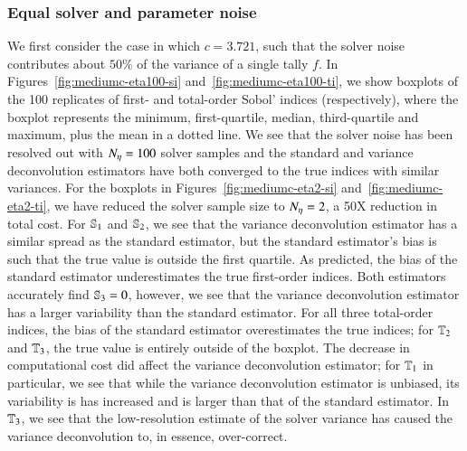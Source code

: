\subsubsection{Equal solver and parameter noise}
We first consider the case in which $c=3.721$, such that the solver noise contributes about $50\%$ of the variance of a single tally $f$.
In Figures~\ref{fig:mediumc-eta100-si} and~\ref{fig:mediumc-eta100-ti}, we show boxplots of the 100 replicates of first- and total-order Sobol’ indices (respectively), where the boxplot represents the minimum, first-quartile, median, third-quartile and maximum, plus the mean in a dotted line.
We see that the solver noise has been resolved out with $\Neta=100$ solver samples and the standard and variance deconvolution estimators have both converged to the true indices with similar variances. 
For the boxplots in Figures~\ref{fig:mediumc-eta2-si} and~\ref{fig:mediumc-eta2-ti}, we have reduced the solver sample size to $\Neta=2$, a 50X reduction in total cost. 
For $\S{1}$ and $\S{2}$, we see that the variance deconvolution estimator has a similar spread as the standard estimator, but the standard estimator's bias is such that the true value is outside the first quartile.
As predicted, the bias of the standard estimator underestimates the true first-order indices.
Both estimators accurately find $\S{3}=0$, however, we see that the variance deconvolution estimator has a larger variability than the standard estimator.
For all three total-order indices, the bias of the standard estimator overestimates the true indices; for $\T{2}$ and $\T{3}$, the true value is entirely outside of the boxplot.
The decrease in computational cost did affect the variance deconvolution estimator; for $\T{1}$ in particular, we see that while the variance deconvolution estimator is unbiased, its variability is has increased and is larger than that of the standard estimator.
In $\T{3}$, we see that the low-resolution estimate of the solver variance has caused the variance deconvolution to, in essence, over-correct.

